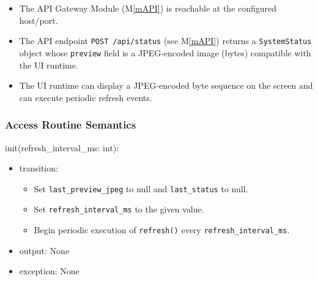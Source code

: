 \documentclass[12pt, titlepage]{article}
\newcommand{\mref}[1]{M\ref{#1}}
\begin{document}
\begin{itemize}
  \item The API Gateway Module (\mref{mAPI}) is reachable at the configured host/port.
  \item The API endpoint \texttt{POST /api/status} (see \mref{mAPI}) returns a
        \texttt{SystemStatus} object whose \texttt{preview} field is a JPEG-encoded
        image (bytes) compatible with the UI runtime.
  \item The UI runtime can display a JPEG-encoded byte sequence on the screen and can
        execute periodic refresh events.
\end{itemize}

\subsubsection{Access Routine Semantics}

\noindent init(refresh\_interval\_ms: int):
\begin{itemize}
  \item transition:
        \begin{itemize}
          \item Set \texttt{last\_preview\_jpeg} to null and \texttt{last\_status} to null.
          \item Set \texttt{refresh\_interval\_ms} to the given value.
          \item Begin periodic execution of \texttt{refresh()} every
                \texttt{refresh\_interval\_ms}.
        \end{itemize}
  \item output: None
  \item exception: None
\end{itemize}
\end{document}
